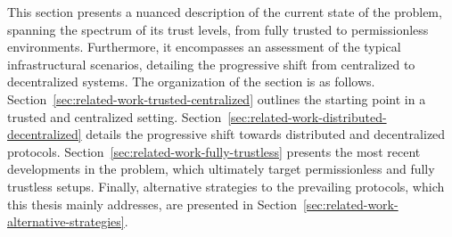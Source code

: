 This section presents a nuanced description of the current state of the \pol{} problem, spanning the spectrum of its trust levels, from fully trusted to permissionless environments. Furthermore, it encompasses an assessment of the typical infrastructural scenarios, detailing the progressive shift from centralized to decentralized systems. The organization of the section is as follows. Section~\ref{sec:related-work-trusted-centralized} outlines the starting point in a trusted and centralized setting. Section~\ref{sec:related-work-distributed-decentralized} details the progressive shift towards distributed and decentralized protocols. Section~\ref{sec:related-work-fully-trustless} presents the most recent developments in the \pol{} problem, which ultimately target permissionless and fully trustless setups. Finally, alternative strategies to the prevailing \pol{} protocols, which this thesis mainly addresses, are presented in Section~\ref{sec:related-work-alternative-strategies}.











